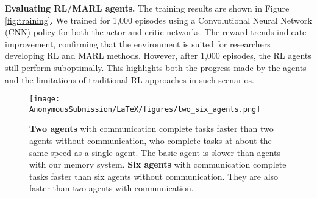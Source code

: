 \textbf{Evaluating RL/MARL agents. }The training results are shown in Figure \ref{fig:training}. 
We trained for 1,000 episodes using a Convolutional Neural Network (CNN) policy for both the actor and critic networks. The reward trends indicate improvement, confirming that the environment is suited for researchers developing RL and MARL methods. However, after 1,000 episodes, the RL agents still perform suboptimally. This highlights both the progress made by the agents and the limitations of traditional RL approaches in such scenarios.


\begin{figure}[!b]
    \centering
    \texttt{[image: AnonymousSubmission/LaTeX/figures/two\_six\_agents.png]}
    \caption{\textbf{Two agents} with communication complete tasks faster than two agents without communication, who complete tasks at about the same speed as a single agent. The basic agent is slower than agents with our memory system. \textbf{Six agents} with communication complete tasks faster than six agents without communication. They are also faster than two agents with communication.}
    \label{fig:agents_results}
\end{figure}


